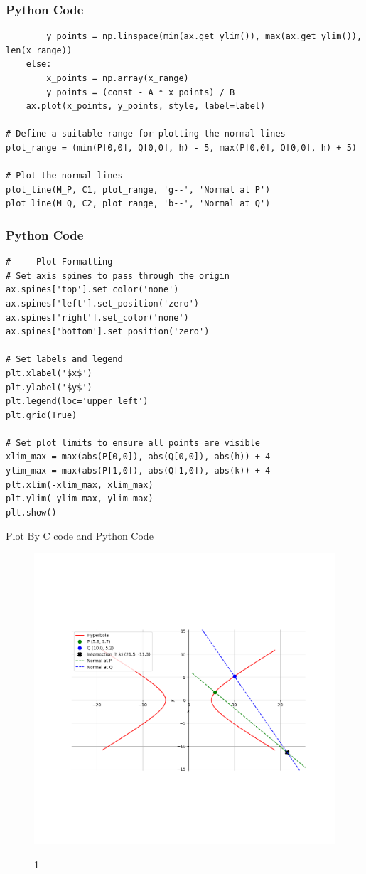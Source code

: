 \documentclass{beamer}
\begin{document}
\begin{frame}[fragile]
\frametitle{Python Code}
\begin{lstlisting}
        y_points = np.linspace(min(ax.get_ylim()), max(ax.get_ylim()), len(x_range))
    else:
        x_points = np.array(x_range)
        y_points = (const - A * x_points) / B
    ax.plot(x_points, y_points, style, label=label)

# Define a suitable range for plotting the normal lines
plot_range = (min(P[0,0], Q[0,0], h) - 5, max(P[0,0], Q[0,0], h) + 5)

# Plot the normal lines
plot_line(M_P, C1, plot_range, 'g--', 'Normal at P')
plot_line(M_Q, C2, plot_range, 'b--', 'Normal at Q')
\end{lstlisting}
\end{frame}
\begin{frame}[fragile]
\frametitle{Python Code}
\begin{lstlisting}
# --- Plot Formatting ---
# Set axis spines to pass through the origin
ax.spines['top'].set_color('none')
ax.spines['left'].set_position('zero')
ax.spines['right'].set_color('none')
ax.spines['bottom'].set_position('zero')

# Set labels and legend
plt.xlabel('$x$')
plt.ylabel('$y$')
plt.legend(loc='upper left')
plt.grid(True)

# Set plot limits to ensure all points are visible
xlim_max = max(abs(P[0,0]), abs(Q[0,0]), abs(h)) + 4
ylim_max = max(abs(P[1,0]), abs(Q[1,0]), abs(k)) + 4
plt.xlim(-xlim_max, xlim_max)
plt.ylim(-ylim_max, ylim_max)
plt.show()
\end{lstlisting}
\end{frame}
\begin{frame}{Plot By C code and Python Code}
    \begin{figure}
    \centering
    \includegraphics[width=0.7\columnwidth]{figs/Figure_1.png}
    \label{fig:placeholder}
    \caption{1}
\end{figure}
\end{frame}
\end{document}
